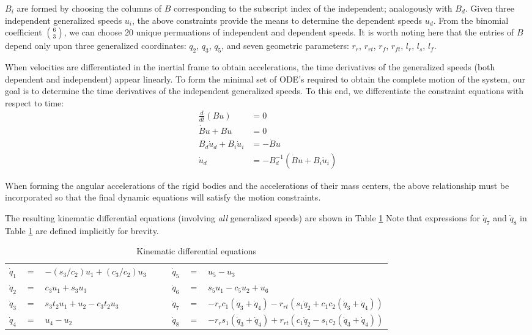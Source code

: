 \documentclass[letterpaper,11pt]{article}
\begin{document}
$B_i$ are formed by choosing the columns of $B$ corresponding to the subscript
index of the independent; analogously with $B_d$.  Given three independent
generalized speeds $u_i$, the above constraints provide the means to determine
the dependent speeds $u_d$.  From the binomial coefficient ${6 \choose 3}$, we
can choose 20 unique permuations of independent and dependent speeds.  It is
worth noting here that the entries of $B$ depend only upon three generalized
coordinates: $q_2$, $q_3$, $q_5$, and seven geometric parameters: $r_r$,
$r_{rt}$, $r_f$, $r_{ft}$, $l_r$, $l_s$, $l_f$.

When velocities are differentiated in the inertial frame to obtain
accelerations, the time derivatives of the generalized speeds (both dependent
and independent) appear linearly.  To form the minimal set of ODE's required to obtain
the complete motion of the system, our goal is to determine the time
derivatives of the independent generalized speeds.  To this end, we
differentiate the constraint equations with respect to time:
\begin{align*}
  \frac{d}{dt}\left(B u\right) & = 0 \\
  \dot{B} u + B \dot{u} & = 0 \\
  B_d \dot{u}_d + B_i \dot{u}_i & = -\dot{B} u \\
  \dot{u}_d & = -B_d^{-1} \left(\dot{B} u  + B_i \dot{u}_i \right)
\end{align*}

When forming the angular accelerations of the rigid bodies and the
accelerations of their mass centers, the above relationship must be
incorporated so that the final dynamic equations will satisfy the motion
constraints.

The resulting kinematic differential equations
(involving {\it{all}} generalized speeds) are shown in Table \ref{kindiffs}
Note that expressions for $\dot{q}_7$ and $\dot{q}_8$ in Table \ref{kindiffs}
are defined implicitly for brevity.
\begin{table}[!h]
  \begin{center}
    \begin{tabular}{rclcrcl}
        $\dot{q}_1$ & $=$ & $-(s_3/c_2) u_1 + (c_3/c_2) u_3$ &$\quad$&
        $\dot{q}_5$ & $=$ & $u_5 - u_3$ \\
        $\dot{q}_2$ & $=$ & $c_3 u_1 + s_3 u_3$ &$\quad$&
        $\dot{q}_6$ & $=$ & $s_5 u_1 - c_5 u_2 + u_6$ \\
        $\dot{q}_3$ & $=$ & $s_3 t_2 u_1 + u_2 - c_3 t_2 u_3$ &$\quad$&
        $\dot{q}_7$ & $=$ & $-r_r c_1 (\dot{q}_3 + \dot{q}_4) -
        r_{rt}(s_1 \dot{q}_2 + c_1 c_2 (\dot{q}_3 + \dot{q}_4))$\\
        $\dot{q}_4$ & $=$ & $u_4 - u_2$ & $\quad$ &
        $\dot{q}_8$ & $=$ & $-r_r s_1 (\dot{q}_3 + \dot{q}_4) +
        r_{rt}(c_1 \dot{q}_2 - s_1 c_2 (\dot{q}_3 + \dot{q}_4))$
    \end{tabular}
  \end{center}
  \caption{Kinematic differential equations}
  \label{kindiffs}
\end{table}
\end{document}

